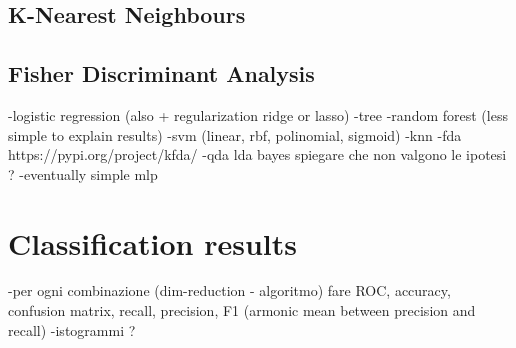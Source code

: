 \documentclass[letterpaper]{article}
\begin{document}
	\subsection{K-Nearest Neighbours}
	\subsection{Fisher Discriminant Analysis}
	
	
	-logistic regression (also + regularization ridge or lasso)
	-tree
	-random forest (less simple to explain results)
	-svm (linear, rbf, polinomial, sigmoid)
	-knn
	-fda https://pypi.org/project/kfda/
	-qda lda bayes spiegare che non valgono le ipotesi ?
	-eventually simple mlp
	
	\section{Classification results}
	-per ogni combinazione (dim-reduction - algoritmo) fare ROC, accuracy, confusion matrix, recall, precision, F1 (armonic mean between precision and recall)
	-istogrammi ? 
	
	
	
	\newpage
	\printbibliography
	\nocite{MohriRostamizadehTalwalkar18}
	\nocite{understandingml}
	
	
\end{document}
